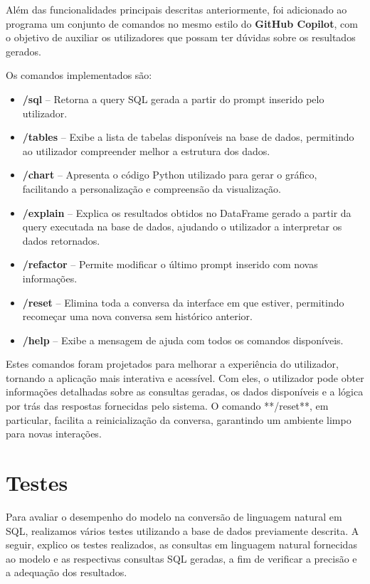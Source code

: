 \documentclass{article}
\begin{document}
\hspace*{1em} Além das funcionalidades principais descritas anteriormente, foi adicionado ao programa um conjunto de comandos no mesmo estilo do \textbf{GitHub Copilot}, com o objetivo de auxiliar os utilizadores que possam ter dúvidas sobre os resultados gerados.  

Os comandos implementados são:  

\begin{itemize}
    \item \textbf{/sql} – Retorna a query SQL gerada a partir do prompt inserido pelo utilizador.
    \item \textbf{/tables} – Exibe a lista de tabelas disponíveis na base de dados, permitindo ao utilizador compreender melhor a estrutura dos dados.
    \item \textbf{/chart} – Apresenta o código Python utilizado para gerar o gráfico, facilitando a personalização e compreensão da visualização.
    \item \textbf{/explain} – Explica os resultados obtidos no DataFrame gerado a partir da query executada na base de dados, ajudando o utilizador a interpretar os dados retornados.
    \item \textbf{/refactor} – Permite modificar o último prompt inserido com novas informações.
    \item \textbf{/reset} – Elimina toda a conversa da interface em que estiver, permitindo recomeçar uma nova conversa sem histórico anterior.
    \item \textbf{/help} – Exibe a mensagem de ajuda com todos os comandos disponíveis.
\end{itemize}

 Estes comandos foram projetados para melhorar a experiência do utilizador, tornando a aplicação mais interativa e acessível. Com eles, o utilizador pode obter informações detalhadas sobre as consultas geradas, os dados disponíveis e a lógica por trás das respostas fornecidas pelo sistema. O comando **/reset**, em particular, facilita a reinicialização da conversa, garantindo um ambiente limpo para novas interações.  


\section{Testes}

Para avaliar o desempenho do modelo na conversão de linguagem natural em SQL, realizamos vários testes utilizando a base de dados previamente descrita. A seguir, explico os testes realizados, as consultas em linguagem natural fornecidas ao modelo e as respectivas consultas SQL geradas, a fim de verificar a precisão e a adequação dos resultados.
\end{document}
